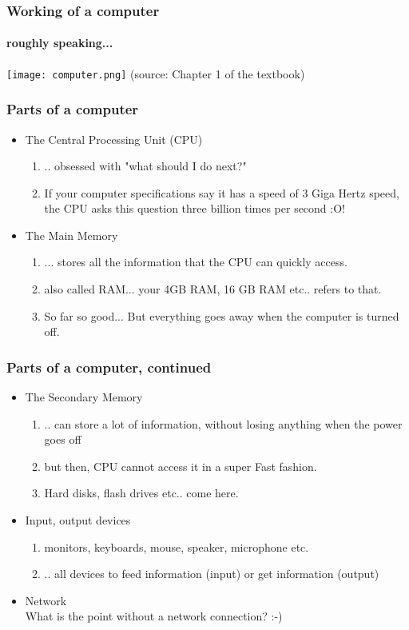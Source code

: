 \documentclass{beamer}
\begin{document}
\begin{frame}
\frametitle{Working of a computer}
\framesubtitle{roughly speaking...}
\texttt{[image: computer.png]}
\medskip (source: Chapter 1 of the textbook)
\end{frame}

\begin{frame}
\frametitle{Parts of a computer}
\begin{itemize}
\item The Central Processing Unit (CPU)
\begin{enumerate}
\item .. obsessed with "what should I do next?"
\item If your computer specifications say it has a speed of 3 Giga Hertz speed, the CPU asks this question three billion times per second :O!
\end{enumerate}
\item The Main Memory
\begin{enumerate}
\item ... stores all the information that the CPU can quickly access.
\item also called RAM... your 4GB RAM, 16 GB RAM etc.. refers to that.
\item So far so good... But everything goes away when the computer is turned off.
\end{enumerate}
\end{itemize}
\end{frame}

\begin{frame}
\frametitle{Parts of a computer, continued}
\begin{itemize}
\item The Secondary Memory
\begin{enumerate}
\item .. can store a lot of information, without losing anything when the power goes off
\item but then, CPU cannot access it in a super Fast fashion.
\item Hard disks, flash drives etc.. come here.
\end{enumerate}
\item Input, output devices
\begin{enumerate}
\item monitors, keyboards, mouse, speaker, microphone etc. 
\item .. all devices to feed information (input) or get information (output)
\end{enumerate}
\item Network
\\ What is the point without a network connection? :-)
\end{itemize}
\end{frame}
\end{document}
